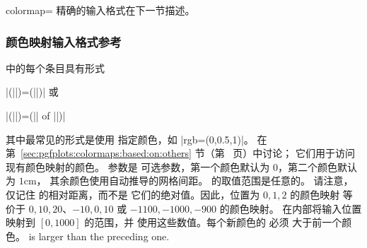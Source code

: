 \begin{pgfplotskey}{colormap=}
    精确的输入格式在下一节描述。


    \subsubsection{颜色映射输入格式参考}
    \label{sec:colormap:input:format}

     中的每个条目具有形式

    |(||)=(||)| 或

    |(||)=(|| of ||)|

    其中最常见的形式是使用  指定颜色，如
    |rgb=(0,0.5,1)|。 在第~\ref{sec:pgfplots:colormaps:based:on:others}
    节（第~\pageref{sec:pgfplots:colormaps:based:on:others} 页）中讨论；
    它们用于访问现有颜色映射的颜色。 参数是
    可选参数，第一个颜色默认为 $0$，第二个颜色默认为 $1\text{cm}$，
    其余颜色使用自动推导的网格间距。 的取值范围是任意的。
    请注意，\PGFPlots{} 仅记住  的相对距离，而不是
    它们的绝对值。因此，位置为 $0,1,2$ 的颜色映射
    等价于 $0,10,20$、$-10,0,10$ 或 $-1100,-1000,-900$ 的颜色映射。
    \PGFPlots{} 在内部将输入位置映射到 $[0,1000]$ 的范围，并
    使用这些数值。每个新颜色的  必须
    大于前一个颜色。
    is larger than the preceding one.


\end{pgfplotskey}
